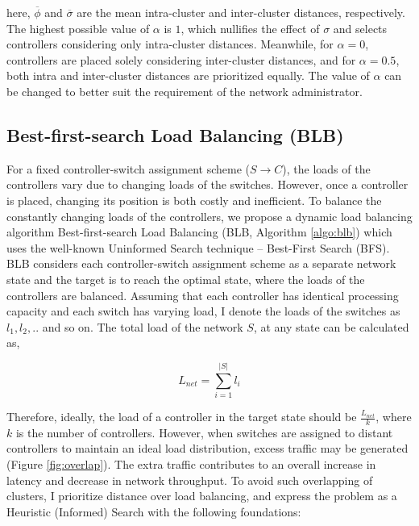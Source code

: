 \documentclass[preprint,12pt]{elsarticle}
\begin{document}
	here, $\overline{\phi}$ and $\overline{\sigma}$ are the  mean intra-cluster and inter-cluster distances, respectively. The highest possible value of $\alpha$ is $1$, which nullifies the effect of $\sigma$ and selects controllers considering only intra-cluster distances. Meanwhile, for $\alpha = 0$, controllers are placed solely considering inter-cluster distances, and for $\alpha=0.5$, both intra and inter-cluster distances are prioritized equally. The value of $\alpha$ can be changed to better suit the requirement of the network administrator.
	
	\subsection{Best-first-search Load Balancing (BLB)} \label{blb}
	
	For a fixed controller-switch assignment scheme ($S\rightarrow C$), the loads of the controllers vary due to changing loads of the switches. However, once a controller is placed, changing its position is both costly and inefficient. To balance the constantly changing loads of the controllers, we propose a dynamic load balancing algorithm Best-first-search Load Balancing (BLB, Algorithm \ref{algo:blb}) which uses the well-known Uninformed Search technique -- Best-First Search (BFS). BLB considers each controller-switch assignment scheme as a separate network state and the target is to reach the optimal state, where the loads of the controllers are balanced. Assuming that each controller has identical processing capacity and each switch has varying load, I denote the loads of the switches as $l_1, l_2, . .$ and so on. The total load of the network $S$, at any state can be calculated as,
	
	\begin{equation}
	L_{net}=\sum_{i=1}^{|S|}l_i
	\end{equation}
	
	Therefore, ideally, the load of a controller in the target state should be $\frac{L_{net}}{k}$, where $k$ is the number of controllers. However, when switches are assigned to distant controllers to maintain an ideal load distribution, excess traffic may be generated (Figure \ref{fig:overlap}). The extra traffic contributes to an overall increase in latency and decrease in network throughput. To avoid such overlapping of clusters, I prioritize distance over load balancing, and express the problem as a Heuristic (Informed) Search with the following foundations:
	
\end{document}
